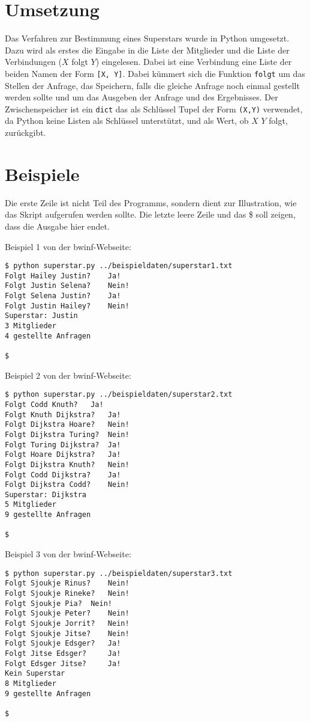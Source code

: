 \documentclass[a4paper,10pt,ngerman]{scrartcl}
\begin{document}
\section{Umsetzung}
Das Verfahren zur Bestimmung eines Superstars wurde in Python umgesetzt.\newline
Dazu wird als erstes die Eingabe in die Liste der Mitglieder und die Liste der Verbindungen
($X$ folgt $Y$) eingelesen. Dabei ist eine Verbindung eine Liste der beiden Namen der Form
\texttt{[X, Y]}. Dabei kümmert sich die Funktion \texttt{folgt} um das Stellen der Anfrage,
das Speichern, falls die gleiche Anfrage noch einmal gestellt werden sollte und um das Ausgeben
der Anfrage und des Ergebnisses. Der Zwischenspeicher ist ein \texttt{dict} das als Schlüssel
Tupel der Form \texttt{(X,Y)} verwendet, da Python keine Listen als Schlüssel unterstützt,
und als Wert, ob $X$ $Y$ folgt, zurückgibt. 

\clearpage

\section{Beispiele}
Die erste Zeile ist nicht Teil des Programms, sondern dient zur Illustration, wie das Skript aufgerufen werden sollte.
Die letzte leere Zeile und das \$ soll zeigen, dass die Ausgabe hier endet.\newline

Beispiel 1 von der bwinf-Webseite:
\begin{lstlisting}
$ python superstar.py ../beispieldaten/superstar1.txt
Folgt Hailey Justin? 	Ja!
Folgt Justin Selena? 	Nein!
Folgt Selena Justin? 	Ja!
Folgt Justin Hailey? 	Nein!
Superstar: Justin
3 Mitglieder
4 gestellte Anfragen

$
\end{lstlisting}

Beispiel 2 von der bwinf-Webseite:
\begin{lstlisting}
$ python superstar.py ../beispieldaten/superstar2.txt
Folgt Codd Knuth? 	Ja!
Folgt Knuth Dijkstra? 	Ja!
Folgt Dijkstra Hoare? 	Nein!
Folgt Dijkstra Turing? 	Nein!
Folgt Turing Dijkstra? 	Ja!
Folgt Hoare Dijkstra? 	Ja!
Folgt Dijkstra Knuth? 	Nein!
Folgt Codd Dijkstra? 	Ja!
Folgt Dijkstra Codd? 	Nein!
Superstar: Dijkstra
5 Mitglieder
9 gestellte Anfragen

$
\end{lstlisting}

Beispiel 3 von der bwinf-Webseite:
\begin{lstlisting}
$ python superstar.py ../beispieldaten/superstar3.txt
Folgt Sjoukje Rinus? 	Nein!
Folgt Sjoukje Rineke? 	Nein!
Folgt Sjoukje Pia? 	Nein!
Folgt Sjoukje Peter? 	Nein!
Folgt Sjoukje Jorrit? 	Nein!
Folgt Sjoukje Jitse? 	Nein!
Folgt Sjoukje Edsger? 	Ja!
Folgt Jitse Edsger? 	Ja!
Folgt Edsger Jitse? 	Ja!
Kein Superstar
8 Mitglieder
9 gestellte Anfragen

$
\end{lstlisting}
\end{document}
